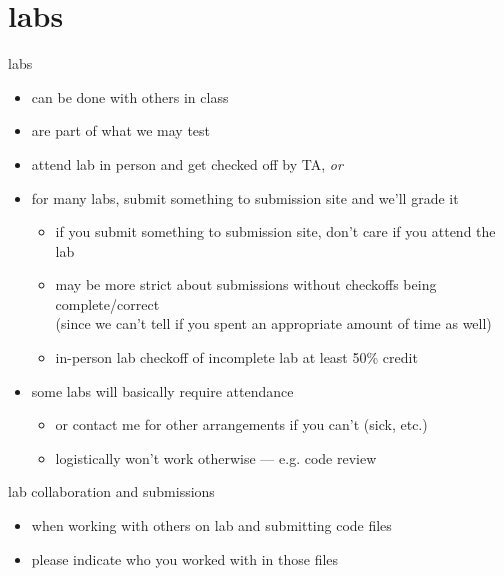 \date{}
\title{}
\date{}

\begin{frame}
    \titlepage
\end{frame}

\section{labs}

\begin{frame}{labs}
    \begin{itemize}
    \item can be done with others in class
    \item are part of what we may test
    \vspace{.5cm}
    \item attend lab in person and get checked off by TA, \textit{or}
    \item for many labs, submit something to submission site and we'll grade it
        \begin{itemize}
        \item if you submit something to submission site, don't care if you attend the lab
        \item may be more strict about submissions without checkoffs being complete/correct \\
            (since we can't tell if you spent an appropriate amount of time as well)
        \item in-person lab checkoff of incomplete lab at least 50\% credit
        \end{itemize}
    \item some labs will basically require attendance
        \begin{itemize}
        \item or contact me for other arrangements if you can't (sick, etc.)
        \item logistically won't work otherwise --- e.g. code review
        \end{itemize}
    \end{itemize}
\end{frame}

\begin{frame}{lab collaboration and submissions}
    \begin{itemize}
    \item when working with others on lab and submitting code files
    \item please indicate who you worked with in those files
    \end{itemize}
\end{frame}

